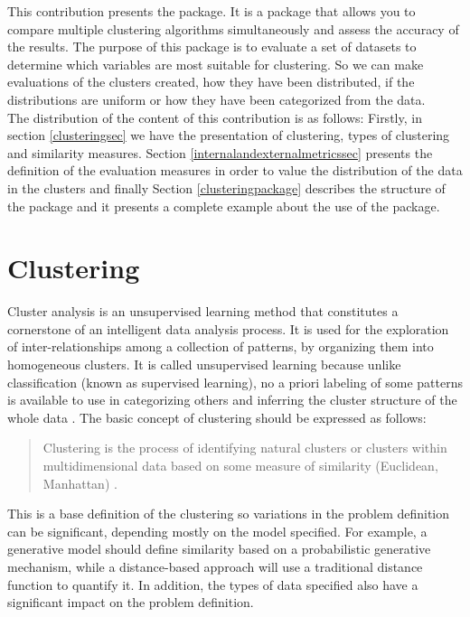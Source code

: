 This contribution presents the  package. It is a package that allows you to compare multiple clustering algorithms simultaneously and assess the accuracy of the results. The purpose of this package is to evaluate a set of datasets to determine which variables are most suitable for clustering. So we can make evaluations of the clusters created, how they have been distributed, if the distributions are uniform or how they have been categorized from the data.\\
The distribution of the content of this contribution is as follows: Firstly, in section \ref{clusteringsec} we have the  presentation of clustering, types of clustering and similarity measures. Section \ref{internalandexternalmetricssec} presents the definition of the evaluation measures in order to value the distribution of the data in the clusters and finally Section \ref{clusteringpackage} describes the structure of the package and it presents a complete example about the use of the package.

\section*{Clustering}\label{clusteringsec}

Cluster analysis is an unsupervised learning method that constitutes a cornerstone of an intelligent data analysis process. It is used for the exploration of inter-relationships among a collection of patterns, by organizing them into homogeneous clusters. It is called unsupervised learning because unlike classification (known as supervised learning), no a priori labeling of some patterns is available to use in categorizing others and inferring the cluster structure of the whole data \citep{b17}. The basic concept of clustering should be expressed as follows:
\\
\begin{quote}
Clustering is the process of identifying natural clusters or clusters within multidimensional data based on some measure of similarity (Euclidean, Manhattan) \citep{b18}.
\end{quote}


This is a base definition of the clustering so variations in the problem definition can be significant, depending mostly on the model specified. For example, a generative model should define similarity based on a probabilistic generative mechanism, while a distance-based approach will use a traditional distance function to quantify it. In addition, the types of data specified also have a significant impact on the problem definition.

